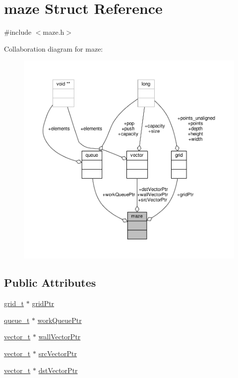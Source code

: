 \hypertarget{structmaze}{\section{maze Struct Reference}
\label{structmaze}
}


{\ttfamily \#include $<$maze.\-h$>$}



Collaboration diagram for maze\-:
\nopagebreak
\begin{figure}[H]
\begin{center}
\leavevmode
\includegraphics[width=350pt]{structmaze__coll__graph}
\end{center}
\end{figure}
\subsection*{Public Attributes}
\begin{DoxyCompactItemize}
\item 
\hyperlink{grid_8h_a19f46bc43e138becd1328c7fd96a448f}{grid\-\_\-t} $\ast$ \hyperlink{structmaze_a1c3618abe388f94f6990cf11539780c1}{grid\-Ptr}
\item 
\hyperlink{queue_8h_aa8acf648f3b0c69d7e132fcc61dc58c7}{queue\-\_\-t} $\ast$ \hyperlink{structmaze_ab7b6ffa234ffc91a338efe69088a6c12}{work\-Queue\-Ptr}
\item 
\hyperlink{vector_8h_a5a1bca6fa9a3f18a2897623094d918da}{vector\-\_\-t} $\ast$ \hyperlink{structmaze_aac2b0e755ef7adab115a9812fb8f6b8d}{wall\-Vector\-Ptr}
\item 
\hyperlink{vector_8h_a5a1bca6fa9a3f18a2897623094d918da}{vector\-\_\-t} $\ast$ \hyperlink{structmaze_a9a60c3cb30fdf50ec40ddabafabaf747}{src\-Vector\-Ptr}
\item 
\hyperlink{vector_8h_a5a1bca6fa9a3f18a2897623094d918da}{vector\-\_\-t} $\ast$ \hyperlink{structmaze_a1478040a9fe78b72493531a7279a0642}{dst\-Vector\-Ptr}
\end{DoxyCompactItemize}


